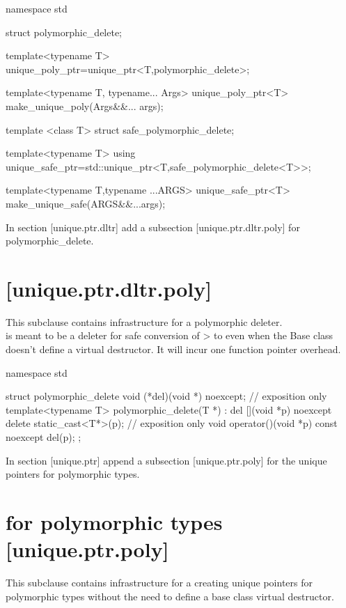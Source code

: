 \documentclass[ebook,11pt,article]{memoir}
\begin{document}
\begin{codeblock}
namespace std{

struct polymorphic_delete;

template<typename T>
unique_poly_ptr=unique_ptr<T,polymorphic_delete>;

template<typename T, typename... Args>
unique_poly_ptr<T> make_unique_poly(Args&&... args);

template <class T>
struct  safe_polymorphic_delete;

template<typename T>
using unique_safe_ptr=std::unique_ptr<T,safe_polymorphic_delete<T>>;

template<typename T,typename ...ARGS>
unique_safe_ptr<T> make_unique_safe(ARGS&&...args);

}
\end{codeblock}

In section [unique.ptr.dltr] add a subsection [unique.ptr.dltr.poly] for polymorphic_delete.

\section{ [unique.ptr.dltr.poly]}
\pnum
This subclause contains infrastructure for a polymorphic deleter.\\

\pnum
\enternote
{} is meant to be a deleter for safe conversion of > to  even when the Base class doesn't define a virtual destructor. It will incur one function pointer overhead.
\exitnote

\begin{codeblock}
namespace std{

struct polymorphic_delete {
	void (*del)(void *) noexcept; // exposition only
	template<typename T>
	polymorphic_delete(T *) 
	: del { [](void *p) noexcept {
			        delete static_cast<T*>(p);} } // exposition only
	{}
	void operator()(void *p) const noexcept
	{del(p);}
};
}
\end{codeblock}


In section [unique.ptr] append a subsection [unique.ptr.poly] for the unique pointers for polymorphic types.

\section{ for polymorphic types [unique.ptr.poly]}
\pnum
This subclause contains infrastructure for a creating unique pointers for polymorphic types without the need to define a base class virtual destructor.\\
\end{document}
